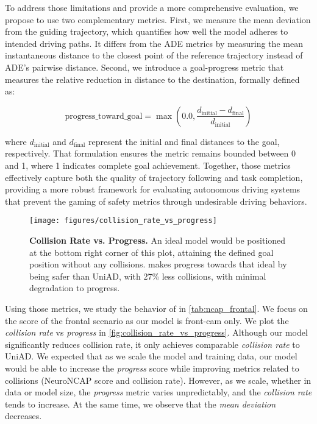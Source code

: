 

To address those limitations and provide a more comprehensive evaluation, we propose to use two complementary metrics. First, we measure the mean deviation from the guiding trajectory, which quantifies how well the model adheres to intended driving paths. It differs from the ADE metrics by measuring the mean instantaneous distance to the closest point of the reference trajectory instead of ADE's pairwise distance. Second, we introduce a goal-progress metric that measures the relative reduction in distance to the destination, formally defined as:

\begin{equation}
    \text{progress\_toward\_goal} = \max(0.0, \frac{d_{\text{initial}} - d_{\text{final}}}{d_{\text{initial}}})
    \label{eq:progress}
\end{equation}

where $d_{\text{initial}}$ and $d_{\text{final}}$ represent the initial and final distances to the goal, respectively. That formulation ensures the metric remains bounded between 0 and 1, where 1 indicates complete goal achievement. Together, those metrics effectively capture both the quality of trajectory following and task completion, providing a more robust framework for evaluating autonomous driving systems that prevent the gaming of safety metrics through undesirable driving behaviors.

\begin{wrapfigure}{L}{0.5\textwidth}
    \vspace{-1em}
    \centering
    \texttt{[image: figures/collision\_rate\_vs\_progress]}
    \caption{\textbf{Collision Rate vs. Progress.} An ideal model would be positioned at the bottom right corner of this plot, attaining the defined goal position without any collisions. \vam{} makes progress towards that ideal by being safer than UniAD, with 27\% less collisions, with minimal degradation to progress.}
    \label{fig:collision_rate_vs_progress}
    \vspace{-1em}
\end{wrapfigure} 

Using those metrics, we study the behavior of \vam in \autoref{tab:ncap_frontal}. We focus on the score of the frontal scenario as our model is front-cam only. We plot the \emph{collision rate} vs \emph{progress} in \autoref{fig:collision_rate_vs_progress}. Although our model significantly reduces collision rate, it only achieves comparable \emph{collision rate} to UniAD. We expected that as we scale the model and training data, our model would be able to increase the \emph{progress} score while improving metrics related to collisions (NeuroNCAP score and collision rate). However, as we scale, whether in data or model size, the \emph{progress} metric varies unpredictably, and the \emph{collision rate} tends to increase. At the same time, we observe that the \emph{mean deviation} decreases.





